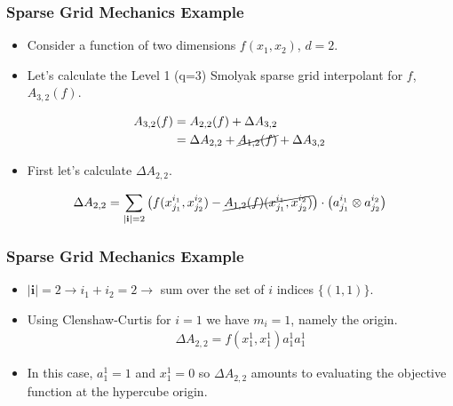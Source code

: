 \documentclass{beamer}
\begin{document}
\begin{frame}
\frametitle{Sparse Grid Mechanics Example}

\begin{itemize}
  \item Consider a function of two dimensions $f(x_1, x_2)$, $d=2$. 
  \item Let's calculate the Level 1 (q=3) Smolyak sparse grid interpolant for $f$, $A_{3,2}(f)$.
\end{itemize}

\begin{align*}
A_{3,2}(f) &= A_{2,2}(f) + \Delta A_{3,2} \\
&= \Delta A_{2,2} + \cancel{A_{1,2}(f)} + \Delta A_{3,2} 
\end{align*}

\begin{itemize}
  \item First let's calculate $\Delta A_{2,2}$. 
\end{itemize}

\begin{align*}
    \Delta A_{2,2} = \sum_{\vert\textbf{i}\vert=2}
     \left(f(x_{j_1}^{i_1},x_{j_2}^{i_2}) - 
      \cancel{A_{1,2}(f)(x_{j_1}^{i_1}, x_{j_2}^{i_2})}\right)\cdot
       \left(a_{j_1}^{i_1}\otimes a_{j_2}^{i_2}\right)
\end{align*}

\end{frame}
\begin{frame}
\frametitle{Sparse Grid Mechanics Example}

\begin{itemize}
  \item $\vert\textbf{i}\vert=2 \rightarrow i_1 + i_2 = 2 \rightarrow$ sum over the set of $i$ indices $\lbrace (1, 1)\rbrace$.
  \item Using Clenshaw-Curtis for $i=1$ we have $m_i=1$, namely the origin. 
\begin{align*}
 \Delta A_{2,2} = f\left( x_{1}^{1},x_{1}^{1}\right)a_{1}^{1}a_{1}^{1}
\end{align*}
  \item In this case, $a_1^1 = 1$ and $x_1^1=0$ so $\Delta A_{2,2}$ amounts to evaluating the objective function at the hypercube origin. 
\end{itemize}

\end{frame}
\end{document}
